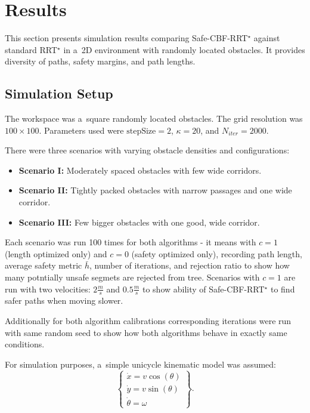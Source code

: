 \documentclass[letterpaper, 10 pt, conference]{ieeeconf}
\begin{document}
\section{Results}
This section presents simulation results comparing Safe-CBF-RRT$^\star$ against standard
RRT$^\star$ in a~2D environment with randomly located obstacles. It provides
diversity of paths, safety margins, and path lengths.

\subsection{Simulation Setup}
The workspace was a~square randomly located obstacles. The grid resolution was
$100\times100$. Parameters used were $\text{stepSize}=2$, $\kappa=20$, and
$N_{iter}=2000$.

There were three scenarios with varying obstacle densities and configurations:
\begin{itemize}
    \item \textbf{Scenario I:} Moderately spaced obstacles with few wide corridors.
    \item \textbf{Scenario II:} Tightly packed obstacles with narrow passages
    and one wide corridor.
    \item \textbf{Scenario III:} Few bigger obstacles with one good, wide corridor.
\end{itemize}
Each scenario was run 100 times for both algorithms - it means with $c=1$
(length optimized only) and $c = 0$ (safety optimized only), recording path length,
average safety metric $\bar h$, number of iterations, and rejection ratio to
show how many potntially unsafe segmets are rejected from tree. Scenarios with
$c=1$ are run with two velocities: $2 \frac{m}{s}$ and $0.5 \frac{m}{s}$ to show
ability of Safe-CBF-RRT$^\star$ to find safer paths when moving slower.

Additionally for both algorithm calibrations corresponding iterations were run
with same random seed to show how both algorithms behave in exactly same
conditions.

For simulation purposes, a~simple unicycle kinematic model was assumed:
\begin{equation}
    \left\{
    \begin{array}{c}   
        \dot{x} = v \cos(\theta)\\
        \dot{y} = v \sin(\theta)\\
        \dot{\theta} = \omega
    \end{array}
    \right\}
    .
\end{equation}
\end{document}
